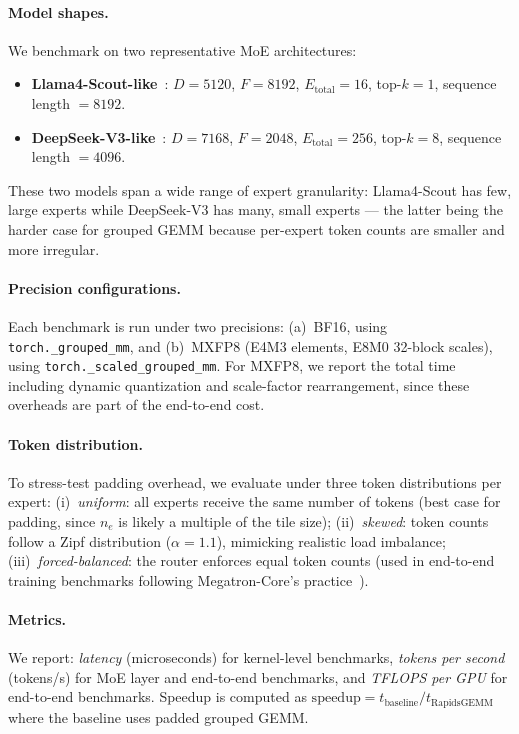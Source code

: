 \documentclass[11pt,a4paper]{article}
\theoremstyle{definition}
\begin{document}
\paragraph{Model shapes.}
We benchmark on two representative MoE architectures:
\begin{itemize}
  \item \textbf{Llama4-Scout-like}~\cite{llama4scout2025}:
    $D = 5120$, $F = 8192$, $E_{\text{total}} = 16$,
    top-$k = 1$, sequence length $= 8192$.
  \item \textbf{DeepSeek-V3-like}~\cite{deepseekv3}:
    $D = 7168$, $F = 2048$, $E_{\text{total}} = 256$,
    top-$k = 8$, sequence length $= 4096$.
\end{itemize}
These two models span a wide range of expert granularity:
Llama4-Scout has few, large experts while DeepSeek-V3 has many,
small experts --- the latter being the harder case for grouped GEMM
because per-expert token counts are smaller and more irregular.

\paragraph{Precision configurations.}
Each benchmark is run under two precisions:
(a)~BF16, using \texttt{torch.\_grouped\_mm}, and
(b)~MXFP8 (E4M3 elements, E8M0 32-block scales), using
\texttt{torch.\_scaled\_grouped\_mm}.
For MXFP8, we report the total time including dynamic quantization
and scale-factor rearrangement, since these overheads are part of
the end-to-end cost.

\paragraph{Token distribution.}
To stress-test padding overhead, we evaluate under three token
distributions per expert:
(i)~\emph{uniform}: all experts receive the same number of tokens
(best case for padding, since $n_e$ is likely a multiple of the tile
size);
(ii)~\emph{skewed}: token counts follow a Zipf distribution
($\alpha = 1.1$), mimicking realistic load imbalance;
(iii)~\emph{forced-balanced}: the router enforces equal token counts
(used in end-to-end training benchmarks following
Megatron-Core's practice~\cite{nvidia2026megatronmoe}).

\paragraph{Metrics.}
We report:
\emph{latency} (microseconds) for kernel-level benchmarks,
\emph{tokens per second} (tokens/s) for MoE layer and end-to-end
benchmarks, and
\emph{TFLOPS per GPU} for end-to-end benchmarks.
Speedup is computed as
$\text{speedup} = t_{\text{baseline}} / t_{\text{RapidsGEMM}}$
where the baseline uses padded grouped GEMM.
\end{document}
